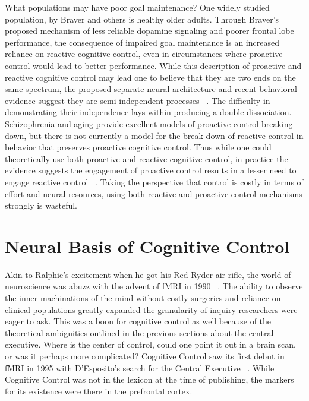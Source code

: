 \documentclass[phd,appendix,figures]{uithesis}
\begin{document}
What populations may have poor goal maintenance?
One widely studied population, by Braver and others is healthy older adults.
Through Braver's proposed mechanism of less reliable dopamine signaling and poorer frontal lobe performance, the consequence of impaired goal maintenance is an increased reliance on reactive cognitive control, even in circumstances where proactive control would lead to better performance.
While this description of proactive and reactive cognitive control may lead one to believe that they are two ends on the same spectrum, the proposed separate neural architecture and recent behavioral evidence suggest they are semi-independent processes ~\citep{Gonthier2016}.
The difficulty in demonstrating their independence lays within producing a double dissociation.
Schizophrenia and aging provide excellent models of proactive control breaking down, but there is not currently a model for the break down of reactive control in behavior that preserves proactive cognitive control.
Thus while one could theoretically use both proactive and reactive cognitive control, in practice the evidence suggests the engagement of proactive control results in a lesser need to engage reactive control ~\citep{Gonthier2016a}.
Taking the perspective that control is costly in terms of effort and neural resources, using both reactive and proactive control mechanisms strongly is wasteful.

\section{Neural Basis of Cognitive Control}

Akin to Ralphie's excitement when he got his Red Ryder air rifle, the world of neuroscience was abuzz with the advent of fMRI in 1990 ~\citep{Ogawa1990}. 
The ability to observe the inner machinations of the mind without costly surgeries and reliance on clinical populations greatly expanded the granularity of inquiry researchers were eager to ask. 
This was a boon for cognitive control as well because of the theoretical ambiguities outlined in the previous sections about the central executive.
Where is the center of control, could one point it out in a brain scan, or was it perhaps more complicated?
Cognitive Control saw its first debut in fMRI in 1995 with D'Esposito's search for the Central Executive ~\citep{DEsposito1995}. 
While Cognitive Control was not in the lexicon at the time of publishing, the markers for its existence were there in the prefrontal cortex.
\end{document}
